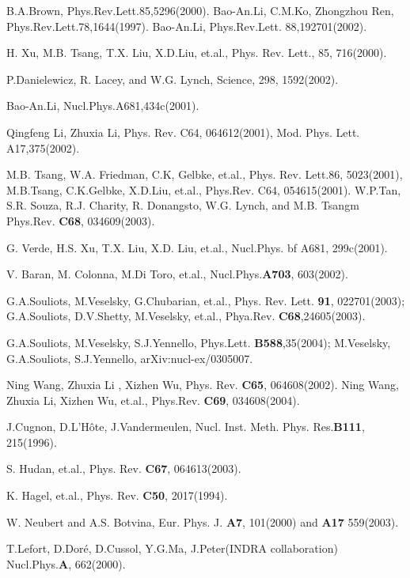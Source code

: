 \documentclass[aps,prc,groupedaddress,showpacs,manuscript]{revtex4}
\begin{document}
\begin{thebibliography}{00}

 B.A.Brown, Phys.Rev.Lett.85,5296(2000).
 Bao-An.Li, C.M.Ko, Zhongzhou Ren, Phys.Rev.Lett.78,1644(1997).
 Bao-An.Li, Phys.Rev.Lett. 88,192701(2002).

 H. Xu, M.B. Tsang, T.X. Liu, X.D.Liu, et.al., Phys. Rev. Lett.,
85, 716(2000).

 P.Danielewicz, R. Lacey, and W.G. Lynch, Science,
298, 1592(2002).

 Bao-An.Li, Nucl.Phys.A681,434c(2001).

 Qingfeng Li, Zhuxia Li, Phys. Rev. C64, 064612(2001), Mod. Phys. Lett. A17,375(2002).

 M.B. Tsang, W.A. Friedman, C.K, Gelbke, et.al., Phys. Rev. Lett.86,
5023(2001), M.B.Tsang, C.K.Gelbke, X.D.Liu, et.al., Phys.Rev. C64,
054615(2001).
 W.P.Tan, S.R. Souza, R.J. Charity, R. Donangsto,
W.G. Lynch, and M.B. Tsangm Phys.Rev. {\bf C68}, 034609(2003).

 G. Verde, H.S. Xu, T.X. Liu, X.D. Liu,
et.al., Nucl.Phys. {bf A681}, 299c(2001).

 V. Baran, M. Colonna, M.Di Toro, et.al., Nucl.Phys.{\bf A703},
603(2002).

 G.A.Souliots, M.Veselsky, G.Chubarian, et.al., Phys. Rev. Lett. {\bf 91},
022701(2003); G.A.Souliots, D.V.Shetty, M.Veselsky, et.al.,
Phya.Rev. {\bf C68},24605(2003).

 G.A.Souliots, M.Veselsky,
S.J.Yennello, Phys.Lett. {\bf B588},35(2004); M.Veselsky,
G.A.Souliots, S.J.Yennello,  arXiv:nucl-ex/0305007.

 Ning Wang, Zhuxia Li , Xizhen Wu, Phys. Rev. {\bf C65},
064608(2002).
 Ning Wang, Zhuxia Li, Xizhen Wu, et.al., Phys.Rev. {\bf C69}, 034608(2004).

 J.Cugnon, D.L'H\^{o}te, J.Vandermeulen,
Nucl. Inst. Meth. Phys. Res.{\bf B111}, 215(1996).

 S. Hudan, et.al., Phys. Rev. {\bf C67}, 064613(2003).

 K. Hagel, et.al., Phys. Rev. {\bf C50}, 2017(1994).

 W. Neubert and A.S. Botvina, Eur. Phys. J. {\bf A7},
101(2000) and {\bf A17} 559(2003).


 T.Lefort, D.Dor\'{e}, D.Cussol, Y.G.Ma, J.Peter(INDRA collaboration)
Nucl.Phys.{\bf A}, 662(2000).

\end{thebibliography}
\end{document}
